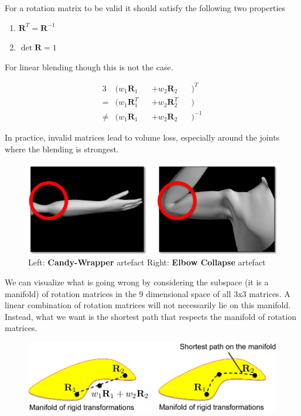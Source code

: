 \documentclass{article}
\begin{document}
For a rotation matrix to be valid it should satisfy the following two properties

\begin{enumerate}[itemsep=0px]
    \item { \(\mathbf{R}^T=\mathbf{R}^{-1}\)}
    \item { \(\det \mathbf{R}= 1\)}
\end{enumerate}

For linear blending though this is not the case.

\begin{alignat*}{3}
    &(w_1 \mathbf{R}_1 &&+ w_2 \mathbf{R}_2&&)^T \\
    = &(w_1 \mathbf{R}_1^T &&+ w_2 \mathbf{R}_2^T&&) \\
    \neq &(w_1 \mathbf{R}_1 &&+ w_2 \mathbf{R}_2&&)^{-1}
\end{alignat*}

\newpage

In practice, invalid matrices lead to volume loss, especially around the joints where the blending is
strongest.

\begin{figure}[!ht]
    \centering
    \includegraphics[width=0.5\linewidth]{images/linear_blend_skinning_problems.png}
    \caption*{Left: \textbf{Candy-Wrapper} artefact \hspace{20px} Right: \textbf{Elbow Collapse} artefact}
\end{figure}

We can visualize what is going wrong by considering the subspace 
(it is a manifold) of rotation matrices in the 9 dimensional space of all 3x3 matrices.
A linear combination of rotation matrices will not necessarily lie on this manifold.
Instead, what we want is the shortest path that respects the manifold of rotation matrices.

\begin{figure}[!ht]
    \centering
    \includegraphics[width=0.5\linewidth]{images/manifold_of_rigid_transformations.png}
\end{figure}
\end{document}
